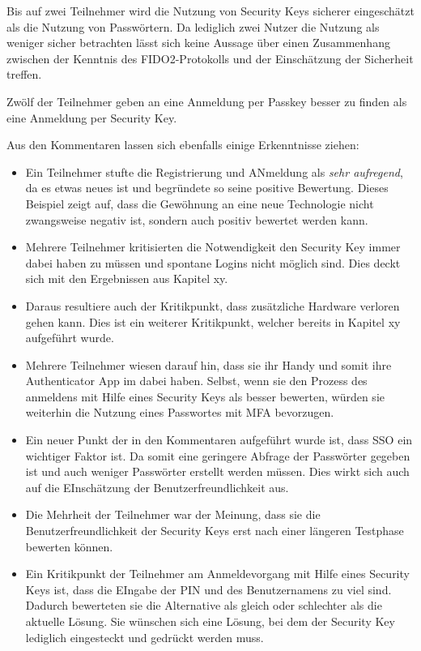 Bis auf zwei Teilnehmer wird die Nutzung von Security Keys sicherer eingeschätzt als die Nutzung von Passwörtern. Da lediglich zwei Nutzer die Nutzung als weniger sicher betrachten lässt sich keine Aussage über einen Zusammenhang zwischen der Kenntnis des FIDO2-Protokolls und der Einschätzung der Sicherheit treffen.

Zwölf der Teilnehmer geben an eine Anmeldung per Passkey besser zu finden als eine Anmeldung per Security Key. 

Aus den Kommentaren lassen sich ebenfalls einige Erkenntnisse ziehen:

\begin{itemize}
    \item Ein Teilnehmer stufte die Registrierung und ANmeldung als \glqq\textit{sehr aufregend}\grqq, da es etwas neues ist und begründete so seine positive Bewertung. Dieses Beispiel zeigt auf, dass die Gewöhnung an eine neue Technologie nicht zwangsweise negativ ist, sondern auch positiv bewertet werden kann.
    \item Mehrere Teilnehmer kritisierten die Notwendigkeit den Security Key immer dabei haben zu müssen und spontane Logins nicht möglich sind. Dies deckt sich mit den Ergebnissen aus Kapitel xy.
    \item Daraus resultiere auch der Kritikpunkt, dass zusätzliche Hardware verloren gehen kann. Dies ist ein weiterer Kritikpunkt, welcher bereits in Kapitel xy aufgeführt wurde.
    \item Mehrere Teilnehmer wiesen darauf hin, dass sie ihr Handy und somit ihre Authenticator App im dabei haben. Selbst, wenn sie den Prozess des anmeldens mit Hilfe eines Security Keys als besser bewerten, würden sie weiterhin die Nutzung eines Passwortes mit \ac{MFA} bevorzugen. 
    \item Ein neuer Punkt der in den Kommentaren aufgeführt wurde ist, dass \ac{SSO} ein wichtiger Faktor ist. Da somit eine geringere Abfrage der Passwörter gegeben ist und auch weniger Passwörter erstellt werden müssen. Dies wirkt sich auch auf die EInschätzung der Benutzerfreundlichkeit aus.
    \item Die Mehrheit der Teilnehmer war der Meinung, dass sie die Benutzerfreundlichkeit der Security Keys erst nach einer längeren Testphase bewerten können.
    \item Ein Kritikpunkt der Teilnehmer am Anmeldevorgang mit Hilfe eines Security Keys ist, dass die EIngabe der PIN und des Benutzernamens zu viel sind. Dadurch bewerteten sie die Alternative als gleich oder schlechter als die aktuelle Lösung. Sie wünschen sich eine Lösung, bei dem der Security Key lediglich eingesteckt und gedrückt werden muss.

\end{itemize}
